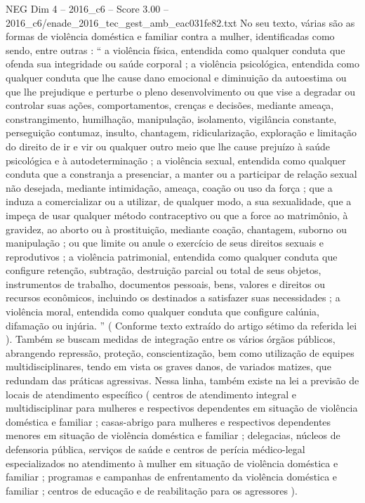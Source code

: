 \begin{textsample}{NEG Dim 4 – 2016\_c6 – Score 3.00 – 2016\_c6/enade\_2016\_tec\_gest\_amb\_eac031fe82.txt}
No seu texto, várias são as formas de violência doméstica e familiar contra a mulher, identificadas como sendo, entre outras : “ a violência física, entendida como qualquer conduta que ofenda sua integridade ou saúde corporal ; a violência psicológica, entendida como qualquer conduta que lhe cause dano emocional e diminuição da autoestima ou que lhe prejudique e perturbe o pleno desenvolvimento ou que vise a degradar ou controlar suas ações, comportamentos, crenças e decisões, mediante ameaça, constrangimento, humilhação, manipulação, isolamento, vigilância constante, perseguição contumaz, insulto, chantagem, ridicularização, exploração e limitação do direito de ir e vir ou qualquer outro meio que lhe cause prejuízo à saúde psicológica e à autodeterminação ; a violência sexual, entendida como qualquer conduta que a constranja a presenciar, a manter ou a participar de relação sexual não desejada, mediante intimidação, ameaça, coação ou uso da força ; que a induza a comercializar ou a utilizar, de qualquer modo, a sua sexualidade, que a impeça de usar qualquer método contraceptivo ou que a force ao matrimônio, à gravidez, ao aborto ou à prostituição, mediante coação, chantagem, suborno ou manipulação ; ou que limite ou anule o exercício de seus direitos sexuais e reprodutivos ; a violência patrimonial, entendida como qualquer conduta que configure retenção, subtração, destruição parcial ou total de seus objetos, instrumentos de trabalho, documentos pessoais, bens, valores e direitos ou recursos econômicos, incluindo os destinados a satisfazer suas necessidades ; a violência moral, entendida como qualquer conduta que configure calúnia, difamação ou injúria. ” ( Conforme texto extraído do artigo sétimo da referida lei ).
Também se buscam medidas de integração entre os vários órgãos públicos, abrangendo repressão, proteção, conscientização, bem como utilização de equipes multidisciplinares, tendo em vista os graves danos, de variados matizes, que redundam das práticas agressivas.
Nessa linha, também existe na lei a previsão de locais de atendimento específico ( centros de atendimento integral e multidisciplinar para mulheres e respectivos dependentes em situação de violência doméstica e familiar ; casas-abrigo para mulheres e respectivos dependentes menores em situação de violência doméstica e familiar ; delegacias, núcleos de defensoria pública, serviços de saúde e centros de perícia médico-legal especializados no atendimento à mulher em situação de violência doméstica e familiar ; programas e campanhas de enfrentamento da violência doméstica e familiar ; centros de educação e de reabilitação para os agressores ).

\end{textsample}
